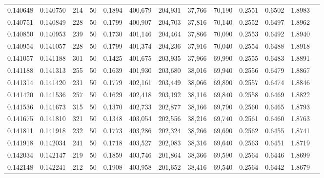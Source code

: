 \begin{tabular}{rrrrrrrrrrrrr}
0.140648 & 0.140750 &   214 &  50 &                                     0.1894 & 400,679 & 204,931 &  37,766 &  70,190 & 0.2551 & 0.6502 & 1.8983 \\
0.140751 & 0.140849 &   228 &  50 &                                     0.1799 & 400,907 & 204,703 &  37,816 &  70,140 & 0.2552 & 0.6497 & 1.8962 \\
0.140850 & 0.140953 &   239 &  50 &                                     0.1730 & 401,146 & 204,464 &  37,866 &  70,090 & 0.2553 & 0.6492 & 1.8940 \\
0.140954 & 0.141057 &   228 &  50 &                                     0.1799 & 401,374 & 204,236 &  37,916 &  70,040 & 0.2554 & 0.6488 & 1.8918 \\
0.141057 & 0.141188 &   301 &  50 &                                     0.1425 & 401,675 & 203,935 &  37,966 &  69,990 & 0.2555 & 0.6483 & 1.8891 \\
0.141188 & 0.141313 &   255 &  50 &                                     0.1639 & 401,930 & 203,680 &  38,016 &  69,940 & 0.2556 & 0.6479 & 1.8867 \\
0.141314 & 0.141420 &   231 &  50 &                                     0.1779 & 402,161 & 203,449 &  38,066 &  69,890 & 0.2557 & 0.6474 & 1.8846 \\
0.141420 & 0.141536 &   257 &  50 &                                     0.1629 & 402,418 & 203,192 &  38,116 &  69,840 & 0.2558 & 0.6469 & 1.8822 \\
0.141536 & 0.141673 &   315 &  50 &                                     0.1370 & 402,733 & 202,877 &  38,166 &  69,790 & 0.2560 & 0.6465 & 1.8793 \\
0.141675 & 0.141810 &   321 &  50 &                                     0.1348 & 403,054 & 202,556 &  38,216 &  69,740 & 0.2561 & 0.6460 & 1.8763 \\
0.141811 & 0.141918 &   232 &  50 &                                     0.1773 & 403,286 & 202,324 &  38,266 &  69,690 & 0.2562 & 0.6455 & 1.8741 \\
0.141918 & 0.142034 &   241 &  50 &                                     0.1718 & 403,527 & 202,083 &  38,316 &  69,640 & 0.2563 & 0.6451 & 1.8719 \\
0.142034 & 0.142147 &   219 &  50 &                                     0.1859 & 403,746 & 201,864 &  38,366 &  69,590 & 0.2564 & 0.6446 & 1.8699 \\
0.142148 & 0.142241 &   212 &  50 &                                     0.1908 & 403,958 & 201,652 &  38,416 &  69,540 & 0.2564 & 0.6442 & 1.8679 \\

\end{tabular}
